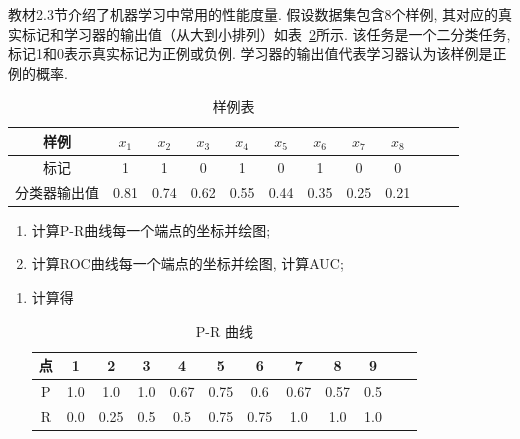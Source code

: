 \documentclass[answers]{exam}  %
\begin{document}
\begin{questions}
  教材2.3节介绍了机器学习中常用的性能度量. 假设数据集包含8个样例, 其对应的真实标记和学习器的输出值（从大到小排列）如表~\ref{table:roc}所示. 该任务是一个二分类任务, 标记1和0表示真实标记为正例或负例.
  学习器的输出值代表学习器认为该样例是正例的概率.
  \begin{table}[!h]
    \centering
    \caption{样例表} \vspace{2mm}\label{table:roc}
    \begin{tabular}{c|c c c c c c c c c c c}\toprule
      样例         & $x_1$ & $x_2$ & $x_3$ & $x_4$ & $x_5$ & $x_{6}$ & $x_{7}$ & $x_{8}$ \\
      \midrule
      标记         & 1     & 1     & 0     & 1     & 0     & 1       & 0       & 0       \\
      \midrule
      分类器输出值 & 0.81  & 0.74  & 0.62  & 0.55  & 0.44  & 0.35    & 0.25    & 0.21    \\
      \bottomrule
    \end{tabular}
  \end{table}
  \begin{enumerate}
    \item 计算P-R曲线每一个端点的坐标并绘图;
    \item 计算ROC曲线每一个端点的坐标并绘图, 计算AUC;
  \end{enumerate}
  \begin{solution}
    \begin{enumerate}
      \item 计算得

            \begin{table}[H]
              \centering
              \caption{P-R 曲线} \vspace{2mm}\label{table:roc}
              \begin{tabular}{c|c c c c c c c c c c c}\toprule
                点 & 1   & 2    & 3   & 4    & 5    & 6    & 7    & 8    & 9   \\
                \midrule
                P  & 1.0 & 1.0  & 1.0 & 0.67 & 0.75 & 0.6  & 0.67 & 0.57 & 0.5 \\
                \midrule
                R  & 0.0 & 0.25 & 0.5 & 0.5  & 0.75 & 0.75 & 1.0  & 1.0  & 1.0 \\
                \bottomrule
              \end{tabular}
            \end{table}


\end{enumerate}
\end{solution}
\end{questions}
\end{document}
